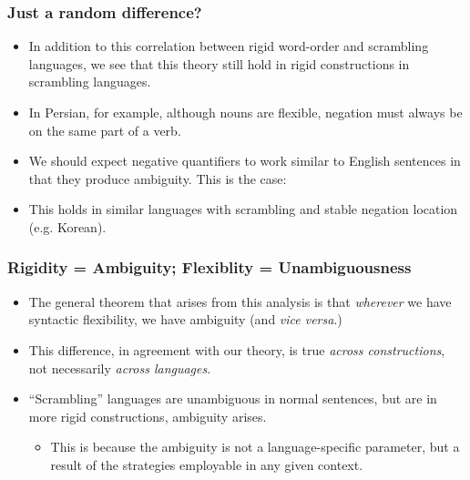 \documentclass{beamer}
\begin{document}
\begin{frame}
\frametitle{Just a random difference?}\pause
\begin{itemize}
\item In addition to this correlation between rigid word-order and scrambling languages, we see that this theory still hold in rigid constructions in scrambling languages.\pause
\item In Persian, for example, although nouns are flexible, negation must always be on the same part of a verb.\pause
\item We should expect negative quantifiers to work similar to English sentences in that they produce ambiguity. This is the case:\pause
\begin{exe}
\end{exe}\pause
\item This holds in similar languages with scrambling and stable negation location (e.g. Korean).

\end{itemize}
\end{frame}

\begin{frame}
	\frametitle{Rigidity = Ambiguity; Flexiblity = Unambiguousness}\pause

	\begin{itemize}
		\item The general theorem that arises from this analysis is that \emph{wherever} we have syntactic flexibility, we have ambiguity (and \textit{vice versa}.)\pause
		\item This difference, in agreement with our theory, is true \emph{across constructions}, not necessarily \emph{across languages}.\pause
		\item ``Scrambling'' languages are unambiguous in normal sentences, but are in more rigid constructions, ambiguity arises.\pause
			\begin{itemize}
				\item This is because the ambiguity is not a language-specific parameter, but a result of the strategies employable in any given context.
			\end{itemize}
	\end{itemize}

\end{frame}
\end{document}
